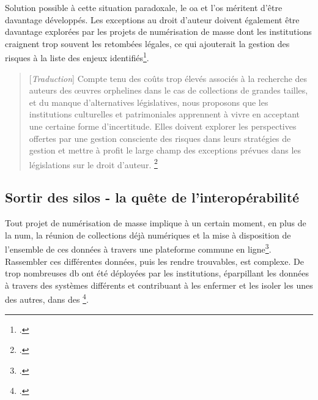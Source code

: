 Solution possible à cette situation paradoxale, le \gls{oa} et l'\gls{os} méritent d'être davantage développés. Les exceptions au droit d'auteur doivent également être davantage explorées par les projets de numérisation de masse dont les institutions craignent trop souvent les retombées légales, ce qui ajouterait la gestion des risques à la liste des enjeux identifiés\footcite[p.661]{stobo_i_2018}. 

\begin{quotation}
[\textit{Traduction}]
Compte tenu des coûts trop élevés associés à la recherche des auteurs des \oe{}uvres orphelines dans le cas de collections de grandes tailles, et du manque d'alternatives législatives, nous proposons que les institutions culturelles et patrimoniales apprennent à vivre en acceptant une certaine forme d'incertitude. Elles doivent explorer les perspectives offertes par une gestion consciente des risques dans leurs stratégies de gestion et mettre à profit le large champ des exceptions prévues dans les législations sur le droit d'auteur.
\footnote{\cite[p.661]{stobo_i_2018}.}
\end{quotation}

\subsection{Sortir des silos - la quête de l'interopérabilité}

Tout projet de numérisation de masse implique à un certain moment, en plus de la \gls{num}, la réunion de collections déjà numériques et la mise à disposition de l'ensemble de ces données à travers une plateforme commune en ligne\footcite{lampert_ramping_2018}. Rassembler ces différentes données, puis les rendre trouvables, est complexe. De trop nombreuses \gls{db} ont été déployées par les institutions, éparpillant les données à travers des systèmes différents et contribuant à les enfermer et les isoler les unes des autres, dans des \footcite{institut_national_dhistoire_de_lart_lundisnum_nodate}. 

